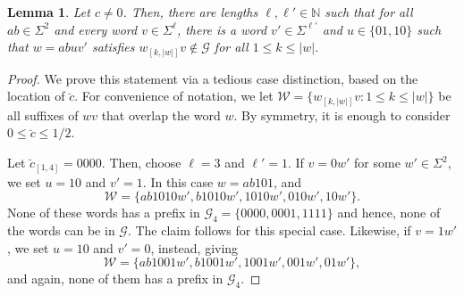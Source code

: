 \documentclass[11pt,reqno]{amsart}
\theoremstyle{plain}
\newtheorem{lemma}[theorem]{Lemma}
\theoremstyle{definition}
\newcommand{\N}{{\mathbb N}}
\newcommand{\mc}{\mathcal}
\begin{document}
\begin{lemma}
\label{LEM:sliding-out-block-II}
Let $c \neq 0$. Then, there are lengths $\ell,\ell' \in \N$ such that for all $ab \in \Sigma^2$ and every word $v \in \Sigma^{\ell}$, there is a word $v' \in \Sigma^{\ell'}$ and $u \in \{01,10\}$ such that $w = ab u v'$ satisfies $w_{[k,|w|]} v \notin \mc G$ for all $1\leqslant k \leqslant |w|$. 
\end{lemma}

\begin{proof}
We prove this statement via a tedious case distinction, based on the location of $\breve{c}$. For convenience of notation, we let $\mc W = \{ w_{[k,|w|]}v: 1\leqslant k \leqslant |w| \}$ be all suffixes of $wv$ that overlap the word $w$. 
By symmetry, it is enough to consider $0\leqslant \breve{c} \leqslant 1/2$.

Let $\breve{c}_{[1,4]} = 0000$. Then, choose $\ell=3$ and $\ell'=1$. If $v=0w'$ for some $w'\in \Sigma^2$, we set $u=10$ and $v'=1$. In this case $w=ab101$, and 
\[
\mc W = \{ab1010w',b1010w',1010w',010w',10w' \}.
\]
 None of these words has a prefix in $\mc G_4 = \{0000,0001,1111 \}$ and hence, none of the words can be in $\mc G$. The claim follows for this special case. Likewise, if $v=1w'$, we set $u=10$ and $v' = 0$, instead, giving 
 \[
 \mc W = \{ab1001w', b1001w', 1001w', 001w', 01w' \},
 \]
and again, none of them has a prefix in $\mc G_4$. 


\end{proof}
\end{document}
